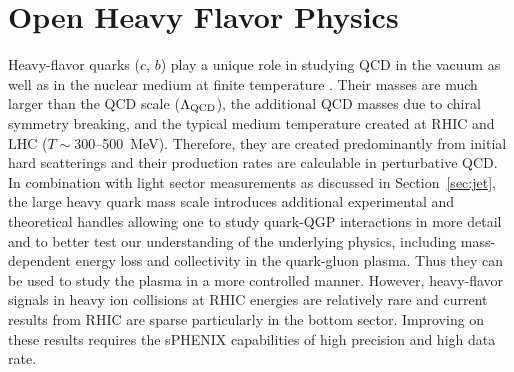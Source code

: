 \section{Open Heavy Flavor Physics}
\label{sec:HF}

Heavy-flavor quarks ($c$, $b$) play a unique role in studying QCD in
the vacuum as well as in the nuclear medium at finite temperature . Their masses are much larger than the QCD scale
($\Lambda_{\rm QCD}$), the additional QCD masses due to chiral
symmetry breaking, and the typical medium temperature created at RHIC
and LHC ($T \sim 300$--500~MeV). Therefore, they are created
predominantly from initial hard scatterings and their production rates
are calculable in perturbative QCD. In combination with light sector
measurements as discussed in Section~\ref{sec:jet}, the large heavy
quark mass scale introduces additional experimental and theoretical
handles allowing one to study quark-QGP interactions in more detail
and to better test our understanding of the underlying physics,
including mass-dependent energy loss and collectivity in the quark-gluon plasma. Thus
they can be used to study the plasma in a more controlled manner.
However, heavy-flavor signals in heavy ion collisions at RHIC energies
are relatively rare and current results from RHIC are sparse particularly in the bottom sector.  Improving on these results requires
the sPHENIX capabilities of high precision and high data rate.

